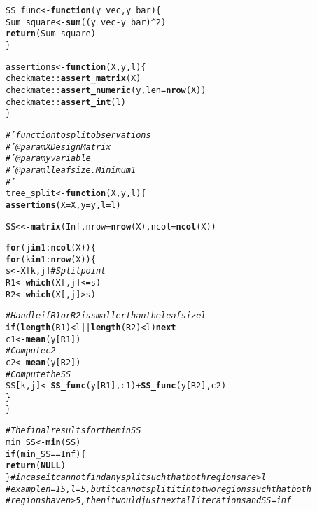 \documentclass[10pt, a4paper, english]{article}\usepackage[]{graphicx}\usepackage[dvipsnames]{xcolor}
\makeatletter
\newcommand{\hlnum}[1]{\textcolor[rgb]{0.686,0.059,0.569}{#1}}%
\newcommand{\hlcom}[1]{\textcolor[rgb]{0.678,0.584,0.686}{\textit{#1}}}%
\newcommand{\hlopt}[1]{\textcolor[rgb]{0,0,0}{#1}}%
\newcommand{\hlstd}[1]{\textcolor[rgb]{0.345,0.345,0.345}{#1}}%
\newcommand{\hlkwa}[1]{\textcolor[rgb]{0.161,0.373,0.58}{\textbf{#1}}}%
\newcommand{\hlkwb}[1]{\textcolor[rgb]{0.69,0.353,0.396}{#1}}%
\newcommand{\hlkwc}[1]{\textcolor[rgb]{0.333,0.667,0.333}{#1}}%
\newcommand{\hlkwd}[1]{\textcolor[rgb]{0.737,0.353,0.396}{\textbf{#1}}}%
\newenvironment{kframe}{%
 \def\at@end@of@kframe{}%
 \ifinner\ifhmode%
  \def\at@end@of@kframe{\end{minipage}}%
  \begin{minipage}{\columnwidth}%
 \fi\fi%
 \def\FrameCommand##1{\hskip\@totalleftmargin \hskip-\fboxsep
 \colorbox{shadecolor}{##1}\hskip-\fboxsep
     \hskip-\linewidth \hskip-\@totalleftmargin \hskip\columnwidth}%
 \MakeFramed {\advance\hsize-\width
   \@totalleftmargin\z@ \linewidth\hsize
   \@setminipage}}%
 {\par\unskip\endMakeFramed%
 \at@end@of@kframe}
\newenvironment{knitrout}{}{} %
\makeatother
\begin{document}
\begin{knitrout}
\color{fgcolor}\begin{kframe}
\begin{alltt}
\hlstd{SS_func} \hlkwb{<-} \hlkwa{function}\hlstd{(}\hlkwc{y_vec}\hlstd{,} \hlkwc{y_bar}\hlstd{)\{}
  \hlstd{Sum_square} \hlkwb{<-} \hlkwd{sum}\hlstd{((y_vec} \hlopt{-} \hlstd{y_bar)}\hlopt{^}\hlnum{2}\hlstd{)}
  \hlkwd{return}\hlstd{(Sum_square)}
\hlstd{\}}

\hlstd{assertions} \hlkwb{<-} \hlkwa{function}\hlstd{(}\hlkwc{X}\hlstd{,}\hlkwc{y}\hlstd{,}\hlkwc{l}\hlstd{)\{}
  \hlstd{checkmate}\hlopt{::}\hlkwd{assert_matrix}\hlstd{(X)}
  \hlstd{checkmate}\hlopt{::}\hlkwd{assert_numeric}\hlstd{(y,} \hlkwc{len} \hlstd{=} \hlkwd{nrow}\hlstd{(X))}
  \hlstd{checkmate}\hlopt{::}\hlkwd{assert_int}\hlstd{(l)}
\hlstd{\}}


\hlcom{#' function to split observations}
\hlcom{#' @param X Design Matrix}
\hlcom{#' @param y variable}
\hlcom{#' @param l leaf size. Minimum 1}
\hlcom{#'}
\hlstd{tree_split} \hlkwb{<-} \hlkwa{function}\hlstd{(}\hlkwc{X}\hlstd{,} \hlkwc{y}\hlstd{,} \hlkwc{l}\hlstd{)\{}
\hlkwd{assertions}\hlstd{(}\hlkwc{X}\hlstd{=X,}\hlkwc{y}\hlstd{=y,}\hlkwc{l}\hlstd{=l)}

  \hlstd{SS} \hlkwb{<<-} \hlkwd{matrix}\hlstd{(}\hlnum{Inf}\hlstd{,} \hlkwc{nrow} \hlstd{=} \hlkwd{nrow}\hlstd{(X),} \hlkwc{ncol} \hlstd{=} \hlkwd{ncol}\hlstd{(X))}

  \hlkwa{for} \hlstd{(j} \hlkwa{in} \hlnum{1}\hlopt{:}\hlkwd{ncol}\hlstd{(X)) \{}
    \hlkwa{for} \hlstd{(k} \hlkwa{in} \hlnum{1}\hlopt{:}\hlkwd{nrow}\hlstd{(X)) \{}
      \hlstd{s} \hlkwb{<-} \hlstd{X[k, j]}  \hlcom{# Split point}
      \hlstd{R1} \hlkwb{<-} \hlkwd{which}\hlstd{(X[, j]} \hlopt{<=} \hlstd{s)}
      \hlstd{R2} \hlkwb{<-} \hlkwd{which}\hlstd{(X[, j]} \hlopt{>} \hlstd{s)}

      \hlcom{# Handle if R1 or R2 is smaller than the leaf size l}
      \hlkwa{if} \hlstd{(}\hlkwd{length}\hlstd{(R1)} \hlopt{<} \hlstd{l} \hlopt{||} \hlkwd{length}\hlstd{(R2)} \hlopt{<} \hlstd{l)} \hlkwa{next}
        \hlstd{c1} \hlkwb{<-} \hlkwd{mean}\hlstd{(y[R1])}
        \hlcom{# Compute c2}
        \hlstd{c2} \hlkwb{<-} \hlkwd{mean}\hlstd{(y[R2])}
        \hlcom{# Compute the SS}
        \hlstd{SS[k, j]} \hlkwb{<-} \hlkwd{SS_func}\hlstd{(y[R1], c1)} \hlopt{+} \hlkwd{SS_func}\hlstd{(y[R2],c2)}
      \hlstd{\}}
    \hlstd{\}}

\hlcom{# The final results for the min SS}
 \hlstd{min_SS} \hlkwb{<-} \hlkwd{min}\hlstd{(SS)}
 \hlkwa{if}\hlstd{(min_SS} \hlopt{==} \hlnum{Inf}\hlstd{) \{}
   \hlkwd{return}\hlstd{(}\hlkwa{NULL}\hlstd{)}
 \hlstd{\}} \hlcom{# in case it cannot find any split such that both regions are > l}
 \hlcom{#example n=15, l = 5, but it cannot split it into two regions such that both}
 \hlcom{# regions have n >5, then it would just next all iterations and SS = inf}


\end{alltt}
\end{kframe}
\end{knitrout}
\end{document}
